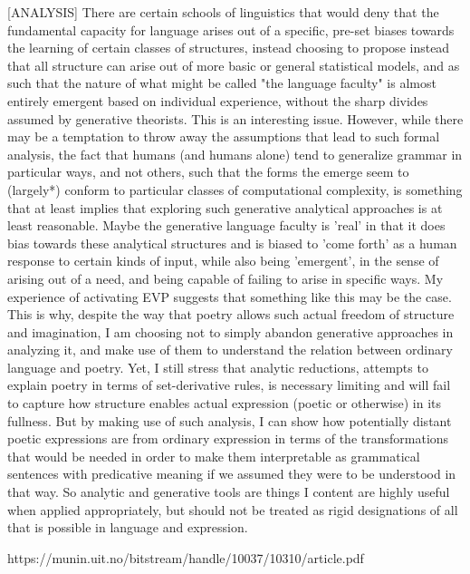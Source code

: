 \documentclass[]{article}
\begin{document}
[ANALYSIS] There are certain schools of linguistics that would deny that the fundamental capacity for language arises out of a specific, pre-set biases towards the learning of certain classes of structures, instead choosing to propose instead that all structure can arise out of more basic or general statistical models, and as such that the nature of what might be called "the language faculty" is almost entirely emergent based on individual experience, without the sharp divides assumed by generative theorists. This is an interesting issue. However, while there may be a temptation to throw away the assumptions that lead to such formal analysis, the fact that humans (and humans alone) tend to generalize grammar in particular ways, and not others, such that the forms the emerge seem to (largely*) conform to particular classes of computational complexity, is something that at least implies that exploring such generative analytical approaches is at least reasonable. Maybe the generative language faculty is 'real' in that it does bias towards these analytical structures and is biased to 'come forth' as a human response to certain kinds of input, while also being 'emergent', in the sense of arising out of a need, and being capable of failing to arise in specific ways. My experience of activating EVP suggests that something like this may be the case. This is why, despite the way that poetry allows such actual freedom of structure and imagination, I am choosing not to simply abandon generative approaches in analyzing it, and make use of them to understand the relation between ordinary language and poetry. Yet, I still stress that analytic reductions, attempts to explain poetry in terms of set-derivative rules, is necessary limiting and will fail to capture how structure enables actual expression (poetic or otherwise) in its fullness. But by making use of such analysis, I can show how potentially distant poetic expressions are from ordinary expression in terms of the transformations that would be needed in order to make them interpretable as grammatical sentences with predicative meaning if we assumed they were to be understood in that way. So analytic and generative tools are things I content are highly useful when applied appropriately, but should not be treated as rigid designations of all that is possible in language and expression.



https://munin.uit.no/bitstream/handle/10037/10310/article.pdf



\subsubsection{}
\end{document}
